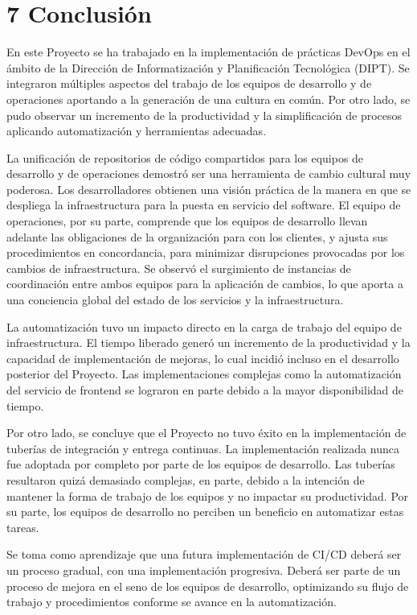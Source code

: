 \chapter{7 Conclusión}

En este Proyecto se ha trabajado en la implementación de prácticas
DevOps en el ámbito de la Dirección de Informatización y Planificación
Tecnológica (DIPT). Se integraron múltiples aspectos del trabajo de
los equipos de desarrollo y de operaciones aportando a la generación
de una cultura en común. Por otro lado, se pudo observar un incremento
de la productividad y la simplificación de procesos aplicando
automatización y herramientas adecuadas.

La unificación de repositorios de código compartidos para los equipos
de desarrollo y de operaciones demostró ser una herramienta de cambio
cultural muy poderosa. Los desarrolladores obtienen una visión
práctica de la manera en que se despliega la infraestructura para la
puesta en servicio del software. El equipo de operaciones, por su
parte, comprende que los equipos de desarrollo llevan adelante las
obligaciones de la organización para con los clientes, y ajusta sus
procedimientos en concordancia, para minimizar disrupciones provocadas
por los cambios de infraestructura. Se observó el surgimiento de
instancias de coordinación entre ambos equipos para la aplicación de
cambios, lo que aporta a una conciencia global del estado de los
servicios y la infraestructura.

La automatización tuvo un impacto directo en la carga de trabajo del
equipo de infraestructura. El tiempo liberado generó un incremento de
la productividad y la capacidad de implementación de mejoras, lo cual
incidió incluso en el desarrollo posterior del Proyecto. Las
implementaciones complejas como la automatización del servicio de
frontend se lograron en parte debido a la mayor disponibilidad de
tiempo.

Por otro lado, se concluye que el Proyecto no tuvo éxito en la
implementación de tuberías de integración y entrega continuas. La
implementación realizada nunca fue adoptada por completo por parte de
los equipos de desarrollo. Las tuberías resultaron quizá demasiado
complejas, en parte, debido a la intención de mantener la forma de
trabajo de los equipos y no impactar su productividad. Por su parte,
los equipos de desarrollo no perciben un beneficio en automatizar
estas tareas.

Se toma como aprendizaje que una futura implementación de CI/CD deberá
ser un proceso gradual, con una implementación progresiva. Deberá ser
parte de un proceso de mejora en el seno de los equipos de desarrollo,
optimizando su flujo de trabajo y procedimientos conforme se avance en
la automatización.

